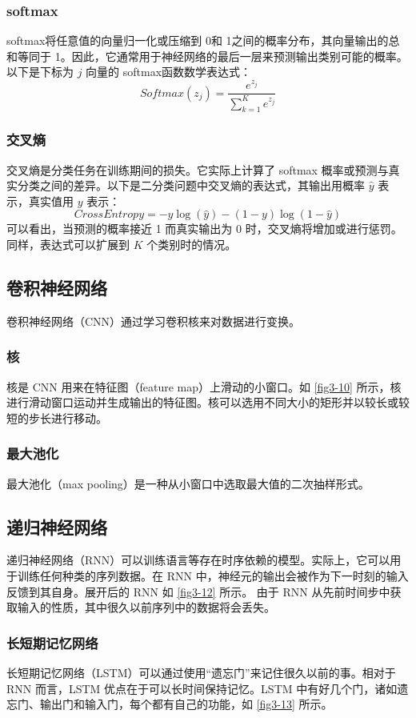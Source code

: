 \subsubsection*{softmax}
softmax将任意值的向量归一化或压缩到 0和 1之间的概率分布，其向量输出的总和等同于 1。因此，它通常用于神经网络的最后一层来预测输出类别可能的概率。以下是下标为 $j$ 向量的 softmax函数数学表达式：
\begin{equation}
    Softmax(z_j) = \frac{e^{z_j}}{\sum_{k=1}^{K}e^{z_j}}
\end{equation}
\subsubsection*{交叉熵}
交叉熵是分类任务在训练期间的损失。它实际上计算了 softmax 概率或预测与真实分类之间的差异。以下是二分类问题中交叉熵的表达式，其输出用概率 $\hat{y}$ 表示，真实值用 $y$ 表示：
\begin{equation}
    CrossEntropy = -y\log(\hat{y})-(1-y)\log(1-\hat{y})
\end{equation}
可以看出，当预测的概率接近 1 而真实输出为 0 时，交叉熵将增加或进行惩罚。同样，表达式可以扩展到 $K$ 个类别时的情况。
\subsection{卷积神经网络}
卷积神经网络（CNN）通过学习卷积核来对数据进行变换。
\subsubsection*{核}
核是 CNN 用来在特征图（feature map）上滑动的小窗口。如 \autoref{fig3-10} 所示，核进行滑动窗口运动并生成输出的特征图。核可以选用不同大小的矩形并以较长或较短的步长进行移动。
\subsubsection*{最大池化}
最大池化（max pooling）是一种从小窗口中选取最大值的二次抽样形式。
\subsection{递归神经网络}
递归神经网络（RNN）可以训练语言等存在时序依赖的模型。实际上，它可以用于训练任何种类的序列数据。在 RNN 中，神经元的输出会被作为下一时刻的输入反馈到其自身。展开后的 RNN 如 \autoref{fig3-12} 所示。
由于 RNN 从先前时间步中获取输入的性质，其中很久以前序列中的数据将会丢失。
\subsubsection*{长短期记忆网络}
长短期记忆网络（LSTM）可以通过使用“遗忘门”来记住很久以前的事。相对于 RNN 而言，LSTM 优点在于可以长时间保持记忆。LSTM 中有好几个门，诸如遗忘门、输出门和输入门，每个都有自己的功能，如 \autoref{fig3-13} 所示。
